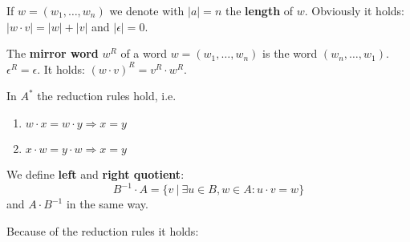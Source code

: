 If $w = (w_1,\ldots,w_n)$ we denote with $|a| = n$ the {\bf length} of $w$.
Obviously it holds: $|w \cdot v| = |w| + |v|$ and $|\epsilon| = 0$.

The {\bf mirror word} $w^R$ of a word $w = (w_1,\ldots,w_n)$ is the word
$(w_n,\ldots,w_1)$. $\epsilon^R = \epsilon$. It holds: $(w \cdot v)^R =
v^R \cdot w^R$.

In $A^*$ the reduction rules hold, i.e.
\begin{enumerate}
  \item $w \cdot x = w \cdot y \Rightarrow x = y$
  \item $x \cdot w = y \cdot w \Rightarrow x = y$
\end{enumerate}

We define {\bf left} and {\bf right quotient}:
\[ B^{-1} \cdot A = \{ v\ |\ \exists u \in B, w \in A : u \cdot v = w \} \]
and $A \cdot B^{-1}$ in the same way.

Because of the reduction rules it holds:



